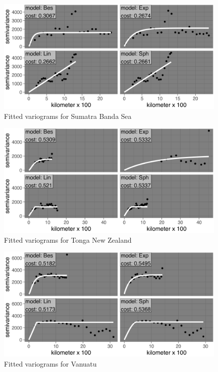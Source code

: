 \begin{figure}
\centering
\includegraphics{assets/figs/chpt3/SumatraBandaSeaVgrms.png}
\caption[Fitted variograms for Sumatra Banda Sea]{Fitted variograms for Sumatra Banda Sea}
\end{figure}

\begin{figure}
\centering
\includegraphics{assets/figs/chpt3/TongaNewZealandVgrms.png}
\caption[Fitted variograms for Tonga New Zealand]{Fitted variograms for Tonga New Zealand}
\end{figure}

\begin{figure}
\centering
\includegraphics{assets/figs/chpt3/VanuatuVgrms.png}
\caption[Fitted variograms for Vanuatu]{Fitted variograms for Vanuatu}
\end{figure}

